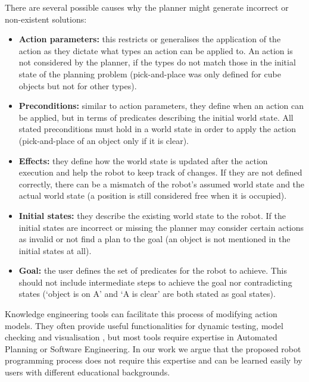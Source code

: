There are several possible causes why the planner might generate incorrect or non-existent solutions:
\begin{itemize}
	\item \textbf{Action parameters:} this restricts or generalises the application of the action as they dictate what types an action can be applied to. An action is not considered by the planner, if the types do not match those in the initial state of the planning problem (\eg pick-and-place was only defined for cube objects but not for other types).
	\item \textbf{Preconditions:} similar to action parameters, they define when an action can be applied, but in terms of predicates describing the initial world state. All stated preconditions must hold in a world state in order to apply the action (\eg pick-and-place of an object only if it is clear).
	\item \textbf{Effects:} they define how the world state is updated after the action execution and help the robot to keep track of changes. If they are not defined correctly, there can be a mismatch of the robot's assumed world state and the actual world state (\eg a position is still considered free when it is occupied).
	\item \textbf{Initial states:} they describe the existing world state to the robot. If the initial states are incorrect or missing the planner may consider certain actions as invalid or not find a plan to the goal (\eg an object is not mentioned in the initial states at all).
	\item \textbf{Goal:} the user defines the set of predicates for the robot to achieve. This  should not include intermediate steps to achieve the goal nor contradicting states (\eg `object is on A' and `A is clear' are both stated as goal states).
\end{itemize}

Knowledge engineering tools can facilitate this process of modifying action models.
They often provide useful functionalities for dynamic testing, model checking and visualisation \cite{simpson2007planning}, but most tools require expertise in Automated Planning or Software Engineering.
In our work we argue that the proposed robot programming process does not require this expertise and can be learned easily by users with different educational backgrounds.
	

